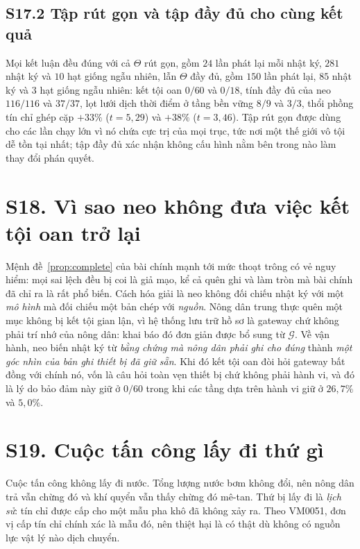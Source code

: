 \subsection*{S17.2 Tập rút gọn và tập đầy đủ cho cùng kết quả}

Mọi kết luận đều đúng với cả $\Theta$ rút gọn, gồm $24$ lần phát lại mỗi nhật ký, $281$ nhật ký
và $10$ hạt giống ngẫu nhiên, lẫn $\Theta$ đầy đủ, gồm $150$ lần phát lại, $85$ nhật ký và $3$
hạt giống ngẫu nhiên: kết tội oan $0/60$ và $0/18$, tính đầy đủ của neo $116/116$ và $37/37$,
lọt lưới dịch thời điểm ở tầng bền vững $8/9$ và $3/3$, thổi phồng tín chỉ ghép cặp $+33\%$
($t=5{,}29$) và $+38\%$ ($t=3{,}46$). Tập rút gọn được dùng cho các lần chạy lớn vì nó chứa cực
trị của mọi trục, tức nơi một thế giới vô tội dễ tồn tại nhất; tập đầy đủ xác nhận không cấu
hình nằm bên trong nào làm thay đổi phán quyết.

\section*{S18. Vì sao neo không đưa việc kết tội oan trở lại}

Mệnh đề~\ref{prop:complete} của bài chính mạnh tới mức thoạt trông có vẻ nguy hiểm: mọi sai
lệch đều bị coi là giả mạo, kể cả quên ghi và làm tròn mà bài chính đã chỉ ra là rất phổ biến.
Cách hóa giải là neo không đối chiếu nhật ký với một \emph{mô hình} mà đối chiếu một bản chép
với \emph{nguồn}. Nông dân trung thực quên một mục không bị kết tội gian lận, vì hệ thống lưu
trữ hồ sơ là gateway chứ không phải trí nhớ của nông dân: khai báo đó đơn giản được bổ sung
từ $\mathcal{G}$. Về vận hành, neo biến nhật ký từ \emph{bằng chứng mà nông dân phải ghi cho
đúng} thành \emph{một góc nhìn của bản ghi thiết bị đã giữ sẵn}. Khi đó kết tội oan đòi hỏi
gateway bất đồng với chính nó, vốn là câu hỏi toàn vẹn thiết bị chứ không phải hành vi, và đó
là lý do bảo đảm này giữ ở $0/60$ trong khi các tầng dựa trên hành vi giữ ở $26{,}7\%$ và
$5{,}0\%$.

\section*{S19. Cuộc tấn công lấy đi thứ gì}

Cuộc tấn công không lấy đi nước. Tổng lượng nước bơm không đổi, nên nông dân trả vẫn chừng
đó và khí quyển vẫn thấy chừng đó mê-tan. Thứ bị lấy đi là \emph{lịch sử}: tín chỉ được cấp
cho một mẫu pha khô đã không xảy ra. Theo VM0051, đơn vị cấp tín chỉ chính xác là mẫu đó, nên
thiệt hại là có thật dù không có nguồn lực vật lý nào dịch chuyển.

